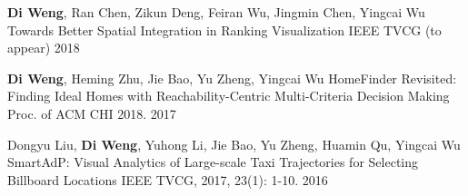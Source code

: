 

\begin{cventries}

  \cventry
    {\textbf{Di Weng}, Ran Chen, Zikun Deng, Feiran Wu, Jingmin Chen, Yingcai Wu} %
    {{\scriptsize Towards Better Spatial Integration in Ranking Visualization}} %
    {IEEE TVCG (to appear)} %
    {2018} %
    {}
  \vspace{-4mm}

  \cventry
    {\textbf{Di Weng}, Heming Zhu, Jie Bao, Yu Zheng, Yingcai Wu} %
    {{\scriptsize HomeFinder Revisited: Finding Ideal Homes with Reachability-Centric Multi-Criteria Decision Making}} %
    {Proc. of ACM CHI 2018.} %
    {2017} %
    {}
  \vspace{-4mm}

  \cventry
    {Dongyu Liu, \textbf{Di Weng}, Yuhong Li, Jie Bao, Yu Zheng, Huamin Qu, Yingcai Wu}
    {\scriptsize SmartAdP: Visual Analytics of Large-scale Taxi Trajectories for Selecting Billboard Locations}
    {IEEE TVCG, 2017, 23(1): 1-10.}
    {2016}
    {}

\end{cventries}
\vspace{-5mm}
